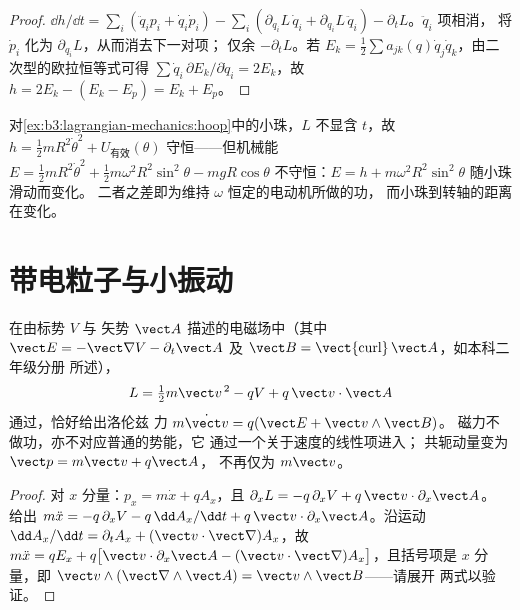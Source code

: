 \begin{proof}
$\dd h/\dd t = \sum_i(\ddot q_ip_i + \dot q_i\dot p_i) -
\sum_i(\partial_{q_i}L\,\dot q_i + \partial_{\dot q_i}L\,\ddot q_i) -
\partial_tL$。$\ddot q_i$ 项相消，
将 $\dot p_i$ 化为 $\partial_{q_i}L$，从而消去下一对项；
仅余 $-\partial_tL$。若 $E_k = \tfrac12\sum a_{jk}(q)\dot
q_j\dot q_k$，由二次型的欧拉恒等式可得 $\sum\dot
q_i\,\partial E_k/\partial\dot q_i = 2E_k$，故 $h = 2E_k - (E_k - E_p)
= E_k + E_p$。
\end{proof}

\begin{example}[旋转圆环守恒 $h$，而非 $E$]\label{ex:b3:lagrangian-mechanics:hoop-energy}
对\cref{ex:b3:lagrangian-mechanics:hoop}中的小珠，$L$ 不显含
$t$，故 $h = \tfrac12 mR^2\dot\theta^2 + U_{\text{有效}}
(\theta)$ 守恒——但机械能 $E = \tfrac12
mR^2\dot\theta^2 + \tfrac12 m\omega^2R^2\sin^2\theta - mgR\cos\theta$
不守恒：$E = h + m\omega^2R^2\sin^2\theta$ 随小珠滑动而变化。
二者之差即为维持 $\omega$ 恒定的电动机所做的功，
而小珠到转轴的距离在变化。
\end{example}

\section{带电粒子与小振动}

\begin{proposition}[带电粒子的拉格朗日量]\label{prop:b3:lagrangian-mechanics:charge}
在由标势 $V$ 与
矢势 $\vect A$ 描述的电磁场中（其中 $\vect E = -\vect\nabla V - \partial_t\vect A$ 及
$\vect B = \operatorname{\vect{curl}}\vect A$，如本科二年级分册
所述），
\[
L = \tfrac12 m\vect v^{\,2} - qV + q\,\vect v\cdot\vect A
\]
通过，恰好给出洛伦兹
力 $m\dot{\vect v} = q(\vect E + \vect v\wedge\vect B)$。
磁力不做功，亦不对应普通的势能，它
通过一个关于速度的线性项进入；
共轭动量变为 $\vect p = m\vect v + q\vect A$，
不再仅为 $m\vect v$。
\end{proposition}

\begin{proof}
对 $x$ 分量：$p_x = m\dot x + qA_x$，且
$\partial_xL = -q\,\partial_xV + q\,\vect v\cdot\partial_x\vect A$。
给出 $m\ddot x = -q\,\partial_xV -
q\,\dd A_x/\dd t + q\,\vect v\cdot\partial_x\vect A$。沿运动
$\dd A_x/\dd t = \partial_tA_x + (\vect v\cdot\vect\nabla)A_x$，故
$m\ddot x = qE_x + q\big[\vect v\cdot\partial_x\vect A - (\vect v\cdot
\vect\nabla)A_x\big]$，且括号项是 $x$ 分量，即 $\vect
v\wedge(\vect\nabla\wedge\vect A) = \vect v\wedge\vect B$——请展开
两式以验证。
\end{proof}

